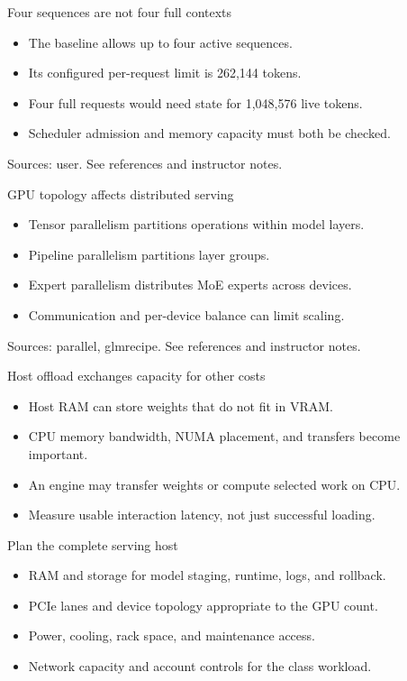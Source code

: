 \documentclass[aspectratio=169,11pt]{beamer}
\begin{document}
\begin{frame}[t,fragile]{Four sequences are not four full contexts}
\fontsize{11.5}{14}\selectfont
\begin{itemize}\setlength{\itemsep}{2mm}
\item The baseline allows up to four active sequences.
\item Its configured per-request limit is 262,144 tokens.
\item Four full requests would need state for 1,048,576 live tokens.
\item Scheduler admission and memory capacity must both be checked.
\end{itemize}
\vfill{\fontsize{6.5}{8}\selectfont\color{UTgray} Sources: user. See references and instructor notes.\par}
\end{frame}
\begin{frame}[t,fragile]{GPU topology affects distributed serving}
\fontsize{11.5}{14}\selectfont
\begin{itemize}\setlength{\itemsep}{2mm}
\item Tensor parallelism partitions operations within model layers.
\item Pipeline parallelism partitions layer groups.
\item Expert parallelism distributes MoE experts across devices.
\item Communication and per-device balance can limit scaling.
\end{itemize}
\vfill{\fontsize{6.5}{8}\selectfont\color{UTgray} Sources: parallel, glmrecipe. See references and instructor notes.\par}
\end{frame}
\begin{frame}[t,fragile]{Host offload exchanges capacity for other costs}
\fontsize{11.5}{14}\selectfont
\begin{itemize}\setlength{\itemsep}{2mm}
\item Host RAM can store weights that do not fit in VRAM.
\item CPU memory bandwidth, NUMA placement, and transfers become important.
\item An engine may transfer weights or compute selected work on CPU.
\item Measure usable interaction latency, not just successful loading.
\end{itemize}
\end{frame}
\begin{frame}[t,fragile]{Plan the complete serving host}
\fontsize{11.5}{14}\selectfont
\begin{itemize}\setlength{\itemsep}{2mm}
\item RAM and storage for model staging, runtime, logs, and rollback.
\item PCIe lanes and device topology appropriate to the GPU count.
\item Power, cooling, rack space, and maintenance access.
\item Network capacity and account controls for the class workload.
\end{itemize}
\end{frame}
\end{document}
